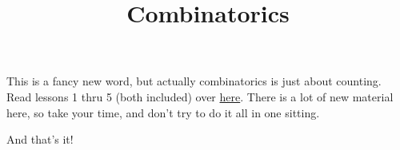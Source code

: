 \documentclass{article}
\title{Combinatorics}
\begin{document}
\maketitle

This is a fancy new word, but actually combinatorics is just about counting.
Read lessons 1 thru 5 (both included) over
\href{http://www.coolmath.com/algebra/20-combinatorics}{here}.
There is a lot of new material here, so take your time, and don't try to do it
all in one sitting.

And that's it! 
\end{document}
